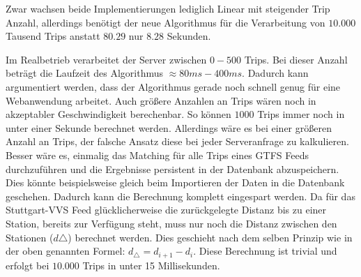   Zwar wachsen beide Implementierungen lediglich Linear mit steigender Trip Anzahl, allerdings benötigt der neue Algorithmus für die Verarbeitung von $10.000$ Tausend Trips anstatt $80.29$ nur $8.28$ Sekunden.  

  Im Realbetrieb verarbeitet der Server zwischen $0 - 500$ Trips. Bei dieser Anzahl beträgt die Laufzeit des Algorithmus $\approx80ms - 400ms$. Dadurch kann argumentiert werden, dass der Algorithmus gerade noch schnell genug für eine Webanwendung arbeitet. Auch größere Anzahlen an Trips wären noch in akzeptabler Geschwindigkeit berechenbar. So können $1000$ Trips immer noch in unter einer Sekunde berechnet werden. Allerdings wäre es bei einer größeren Anzahl an Trips, der falsche Ansatz diese bei jeder Serveranfrage zu kalkulieren. Besser wäre es, einmalig das Matching für alle Trips eines GTFS Feeds durchzuführen und die Ergebnisse persistent in der Datenbank abzuspeichern. Dies könnte beispielsweise gleich beim Importieren der Daten in die Datenbank geschehen. Dadurch kann die Berechnung komplett eingespart werden. Da für das Stuttgart-VVS Feed glücklicherweise die zurückgelegte Distanz bis zu einer Station, bereits zur Verfügung steht, muss nur noch die Distanz zwischen den Stationen ($d\triangle$) berechnet werden. Dies geschieht nach dem selben Prinzip wie in der oben genannten Formel: $ d_\triangle = d_{i+1} - d_i$. Diese Berechnung ist trivial und erfolgt bei $10.000$ Trips in unter 15 Millisekunden.

  
